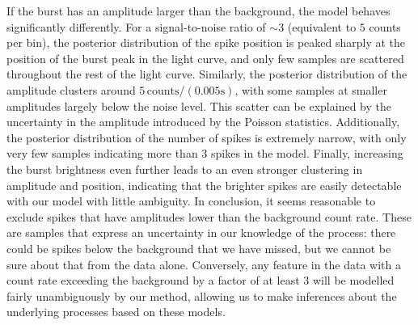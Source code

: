 \documentclass[12pt]{emulateapj}
\begin{document}
If the burst has an amplitude larger than the background, the model behaves significantly differently. For a signal-to-noise ratio of $\sim 3$ (equivalent to $5$ counts per bin), 
the posterior distribution of the spike position is peaked sharply at the position of the burst peak in the light curve, 
and only few samples are scattered throughout the rest of the light curve. Similarly, the posterior distribution of the amplitude clusters 
around $5 \,\mathrm{counts}/(0.005\mathrm{s})$, with some samples at 
smaller amplitudes largely below the noise level. This scatter can be explained by the uncertainty in the amplitude introduced by the Poisson statistics. 
Additionally, the posterior distribution of the
number of spikes is extremely narrow, with only very few samples indicating more than $3$ spikes in the model. 
Finally, increasing the burst brightness even further leads to an even stronger clustering in amplitude and position, indicating that the brighter spikes are easily detectable with our model 
with little ambiguity. 
In conclusion, it seems reasonable to exclude spikes that have amplitudes lower than the background count rate. These are samples that express an uncertainty in our knowledge of 
the process: there could be spikes below the background that we have missed, but we cannot be sure about that from the data alone. Conversely, any feature in the data with a count
rate exceeding the background by a factor of at least $3$ will be modelled fairly unambiguously by our method, allowing us to make inferences about the underlying processes based on
these models.
\end{document}
